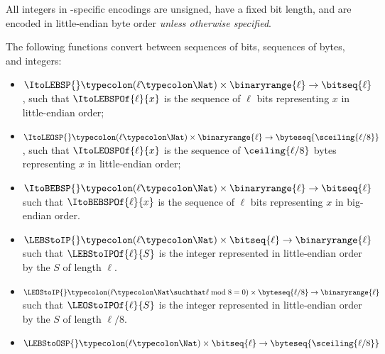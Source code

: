 

All integers in \Zcash-specific encodings are unsigned, have a fixed
bit length, and are encoded in little-endian byte order \emph{unless otherwise
specified}.

\introlist
The following functions convert between sequences of bits, sequences of bytes,
and integers:

\begin{itemize}
  \item $\ItoLEBSP{} \typecolon (\ell \typecolon \Nat) \times \binaryrange{\ell} \rightarrow \bitseq{\ell}$,
        such that $\ItoLEBSPOf{\ell}{x}$ is the sequence of $\ell$ bits representing $x$ in
        little-endian order;
  \item $\ItoLEOSP{} \typecolon (\ell \typecolon \Nat) \times \binaryrange{\ell} \rightarrow \byteseq{\sceiling{\ell/8}}$,
        such that $\ItoLEOSPOf{\ell}{x}$ is the sequence of $\ceiling{\ell/8}$ bytes representing $x$ in
        little-endian order;
  \item $\ItoBEBSP{} \typecolon (\ell \typecolon \Nat) \times \binaryrange{\ell} \rightarrow \bitseq{\ell}$
        such that $\ItoBEBSPOf{\ell}{x}$ is the sequence of $\ell$ bits representing $x$ in
        big-endian order.
  \item $\LEBStoIP{} \typecolon (\ell \typecolon \Nat) \times \bitseq{\ell} \rightarrow \binaryrange{\ell}$
        such that $\LEBStoIPOf{\ell}{S}$ is the integer represented in little-endian order by the
        \bitSequence $S$ of length $\ell$.
  \item $\LEOStoIP{} \typecolon (\ell \typecolon \Nat \suchthat \ell \bmod 8 = 0) \times \byteseq{\ell/8} \rightarrow \binaryrange{\ell}$
        such that $\LEOStoIPOf{\ell}{S}$ is the integer represented in little-endian order by the
        \byteSequence $S$ of length $\ell/8$.
  \item $\LEBStoOSP{} \typecolon (\ell \typecolon \Nat) \times \bitseq{\ell} \rightarrow \byteseq{\sceiling{\ell/8}}$

\end{itemize}
